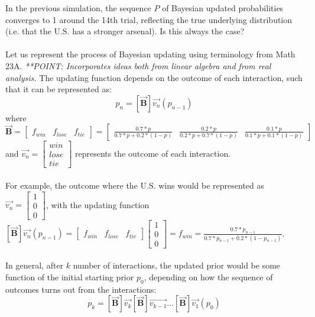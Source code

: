 \documentclass[12pt]{article}
\begin{document}
\begin{itemize}
In the previous simulation, the sequence $P$ of Bayesian updated probabilities converges to 1 around the 14th trial, reflecting the true underlying distribution (i.e. that the U.S. has a stronger arsenal). Is this always the case?\\
\\
Let us represent the process of Bayesian updating using terminology from Math 23A. \textit{**POINT: Incorporates ideas both from linear algebra and from real analysis.} The updating function depends on the outcome of each interaction, such that it can be represented as:\\
$$p_n=[\vec{\mathbf{B}}] \vec{v_n} (p_{n-1})$$
where $\vec{\mathbf{B}}=\begin{bmatrix} f_{win} & f_{lose} & f_{tie} \end{bmatrix}=\begin{bmatrix} \frac{0.7*p}{0.7*p+0.2*(1-p)} & \frac{0.2*p}{0.2*p+0.7*(1-p)}  & \frac{0.1*p}{0.1*p+0.1*(1-p)}  \end{bmatrix}$\\
and $\vec{v_n}=\begin{bmatrix} win \\ lose \\ tie \end{bmatrix}$ represents the outcome of each interaction.\\
\\
For example, the outcome where the U.S. wins would be represented as $\vec{v_n}=\begin{bmatrix} 1 \\ 0 \\ 0 \end{bmatrix}$, with the updating function $[\vec{\mathbf{B}}] \vec{v_n} (p_{n-1})=\begin{bmatrix} f_{win} & f_{lose} & f_{tie} \end{bmatrix} \begin{bmatrix} 1 \\ 0 \\ 0 \end{bmatrix} = f_{win} = \frac{0.7*p_{n-1}}{0.7*p_{n-1}+0.2*(1-p_{n-1})}$.\\
\\
In general, after $k$ number of interactions, the updated prior would be some function of the initial starting prior $p_0$, depending on how the sequence of outcomes turns out from the interactions:\\
$$p_k=[\vec{\mathbf{B}}] \vec{v_k} [\vec{\mathbf{B}}] \vec{v_{k-1}} \dots [\vec{\mathbf{B}}] \vec{v_1} (p_0)$$

\end{itemize}
\end{document}
